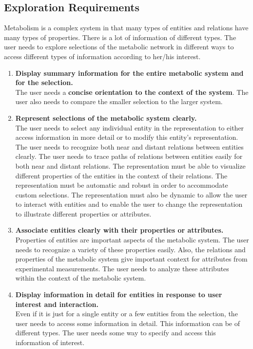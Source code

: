 

\subsection{Exploration Requirements}
Metabolism is a complex system in that many types of entities and relations have many types of properties.
There is a lot of information of different types.
The user needs to explore selections of the metabolic network in different ways to access different types of information according to her/his interest.

\begin{enumerate}

\item \textbf{Display summary information for the entire metabolic system and for the selection.}
\\
The user needs a \textbf{concise orientation to the context of the system}.
The user also needs to compare the smaller selection to the larger system.

\item \textbf{Represent selections of the metabolic system clearly.}
\\
The user needs to select any individual entity in the representation to either access information in more detail or to modify this entity's representation.
The user needs to recognize both near and distant relations between entities clearly.
The user needs to trace paths of relations between entities easily for both near and distant relations.
The representation must be able to visualize different properties of the entities in the context of their relations.
The representation must be automatic and robust in order to accommodate custom selections.
The representation must also be dynamic to allow the user to interact with entities and to enable the user to change the representation to illustrate different properties or attributes.

\item \textbf{Associate entities clearly with their properties or attributes.}
\\
Properties of entities are important aspects of the metabolic system.
The user needs to recognize a variety of these properties easily.
Also, the relations and properties of the metabolic system give important context for attributes from experimental measurements.
The user needs to analyze these attributes within the context of the metabolic system.

\item \textbf{Display information in detail for entities in response to user interest and interaction.}
\\
Even if it is just for a single entity or a few entities from the selection, the user needs to access some information in detail.
This information can be of different types.
The user needs some way to specify and access this information of interest.

\end{enumerate}

